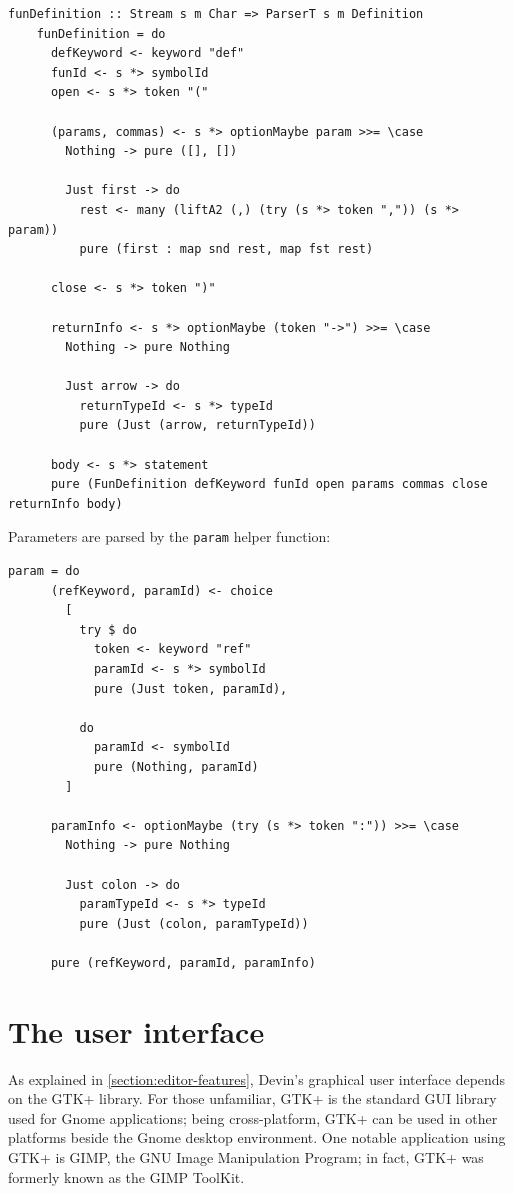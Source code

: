 \documentclass[UdineBachThesis,american,11pt]{PhdThesis}
\begin{document}
  \begin{Verbatim}[gobble=4,fontsize=\small]
    funDefinition :: Stream s m Char => ParserT s m Definition
    funDefinition = do
      defKeyword <- keyword "def"
      funId <- s *> symbolId
      open <- s *> token "("

      (params, commas) <- s *> optionMaybe param >>= \case
        Nothing -> pure ([], [])

        Just first -> do
          rest <- many (liftA2 (,) (try (s *> token ",")) (s *> param))
          pure (first : map snd rest, map fst rest)

      close <- s *> token ")"

      returnInfo <- s *> optionMaybe (token "->") >>= \case
        Nothing -> pure Nothing

        Just arrow -> do
          returnTypeId <- s *> typeId
          pure (Just (arrow, returnTypeId))

      body <- s *> statement
      pure (FunDefinition defKeyword funId open params commas close returnInfo body)
  \end{Verbatim}

  Parameters are parsed by the \mbox{\texttt{param}} helper function:

  \begin{Verbatim}[gobble=4,fontsize=\small]
    param = do
      (refKeyword, paramId) <- choice
        [
          try $ do
            token <- keyword "ref"
            paramId <- s *> symbolId
            pure (Just token, paramId),

          do
            paramId <- symbolId
            pure (Nothing, paramId)
        ]

      paramInfo <- optionMaybe (try (s *> token ":")) >>= \case
        Nothing -> pure Nothing

        Just colon -> do
          paramTypeId <- s *> typeId
          pure (Just (colon, paramTypeId))

      pure (refKeyword, paramId, paramInfo)
  \end{Verbatim}

  \section{The user interface}

  As explained in \autoref{section:editor-features}, Devin's graphical user
  interface depends on the GTK+ library. For those unfamiliar, GTK+ is the
  standard GUI library used for Gnome applications; being cross-platform, GTK+
  can be used in other platforms beside the Gnome desktop environment. One
  notable application using GTK+ is GIMP, the GNU Image Manipulation Program; in
  fact, GTK+ was formerly known as the GIMP ToolKit.
\end{document}
